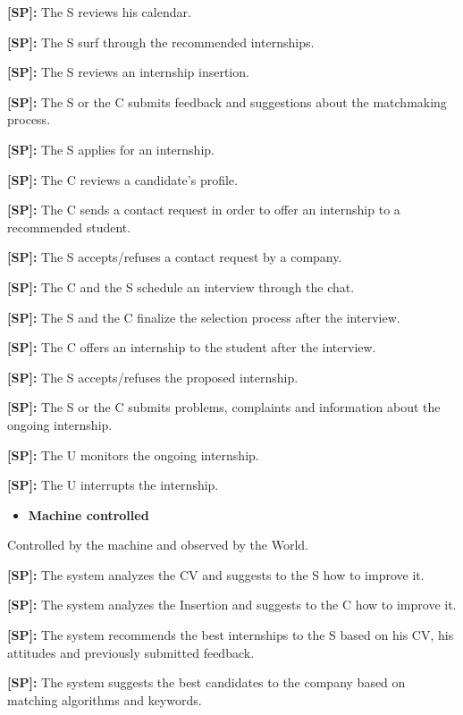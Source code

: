 \textbf{[SP\cs]:} The S reviews his calendar.

\textbf{[SP\cs]:} The S surf through the recommended internships.

\textbf{[SP\cs]:} The S reviews an internship insertion.

\textbf{[SP\cs]:} The S or the C submits feedback and suggestions about the matchmaking process.

\textbf{[SP\cs]:} The S applies for an internship.

\textbf{[SP\cs]:} The C reviews a candidate's profile.

\textbf{[SP\cs]:} The C sends a contact request in order to offer an internship to a recommended student.

\textbf{[SP\cs]:} The S accepts/refuses a contact request by a company.

\textbf{[SP\cs]:} The C and the S schedule an interview through the chat.

\textbf{[SP\cs]:} The S and the C finalize the selection process after the interview.

\textbf{[SP\cs]:} The C offers an internship to the student after the interview.

\textbf{[SP\cs]:} The S accepts/refuses the proposed internship.

\textbf{[SP\cs]:} The S or the C submits problems, complaints and information about the ongoing internship.

\textbf{[SP\cs]:} The U monitors the ongoing internship.

\textbf{[SP\cs]:} The U interrupts the internship. \\

\begin{itemize}
\item
  \textbf{Machine controlled}
\end{itemize}

Controlled by the machine and observed by the World.

\textbf{[SP\cs]:} The system analyzes the CV and suggests to the S how to improve it.

\textbf{[SP\cs]:} The system analyzes the Insertion and suggests to the C how to improve it.

\textbf{[SP\cs]:} The system recommends the best internships to the S based on his CV, his attitudes and previously submitted feedback.

\textbf{[SP\cs]:} The system suggests the best candidates to the company based on matching algorithms and keywords.

